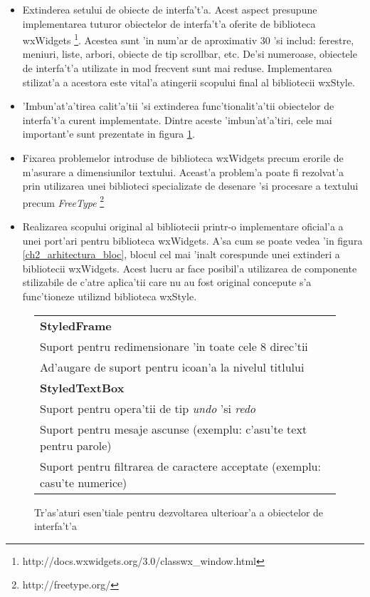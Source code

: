 \begin{itemize}
\item Extinderea setului de obiecte de interfa't'a. Acest aspect presupune implementarea tuturor obiectelor de interfa't'a oferite de biblioteca wxWidgets \footnote{http://docs.wxwidgets.org/3.0/classwx\_window.html}. Acestea sunt 'in num'ar de aproximativ 30 'si includ: ferestre, meniuri, liste, arbori, obiecte de tip scrollbar, etc. De'si numeroase, obiectele de interfa't'a utilizate in mod frecvent sunt mai reduse. Implementarea stilizat'a a acestora este vital'a atingerii scopului final al bibliotecii wxStyle.
\item 'Imbun'at'a'tirea calit'a'tii 'si extinderea func'tionalit'a'tii obiectelor de interfa't'a curent implementate. Dintre aceste 'imbun'at'a'tiri, cele mai important'e sunt prezentate in figura \ref{fig0801}.
\item Fixarea problemelor introduse de biblioteca wxWidgets precum erorile de m'asurare a dimensiunilor textului. Aceast'a problem'a poate fi rezolvat'a prin utilizarea unei biblioteci specializate de desenare 'si procesare a textului precum \emph{FreeType} \footnote{http://freetype.org/}
\item Realizarea scopului original al bibliotecii printr-o implementare oficial'a a unei port'ari pentru biblioteca wxWidgets. A'sa cum se poate vedea 'in figura \ref{ch2_arhitectura_bloc}, blocul cel mai 'inalt corespunde unei extinderi a bibliotecii wxWidgets. Acest lucru ar face posibil'a utilizarea de componente stilizabile de c'atre aplica'tii care nu au fost original concepute s'a func'tioneze utiliz{\ia}nd biblioteca wxStyle.
\end{itemize}

\begin{center}
\begin{figure}[H]
    \centering
    \begin{tabular}{ |p{14cm}| }
        \hline
        \textbf{StyledFrame} \\
        Suport pentru redimensionare 'in toate cele 8 direc'tii \\
        Ad'augare de suport pentru icoan'a la nivelul titlului \\
        \hline
		\textbf{StyledTextBox} \\
        Suport pentru opera'tii de tip \emph{undo} 'si \emph{redo} \\
        Suport pentru mesaje ascunse (exemplu: c'asu'te text pentru parole) \\
		Suport pentru filtrarea de caractere acceptate (exemplu: casu'te numerice) \\
        \hline
    \end{tabular}
    \caption{Tr'as'aturi esen'tiale pentru dezvoltarea ulterioar'a a obiectelor de interfa't'a}
    \label{fig0801}
\end{figure}
\end{center}

